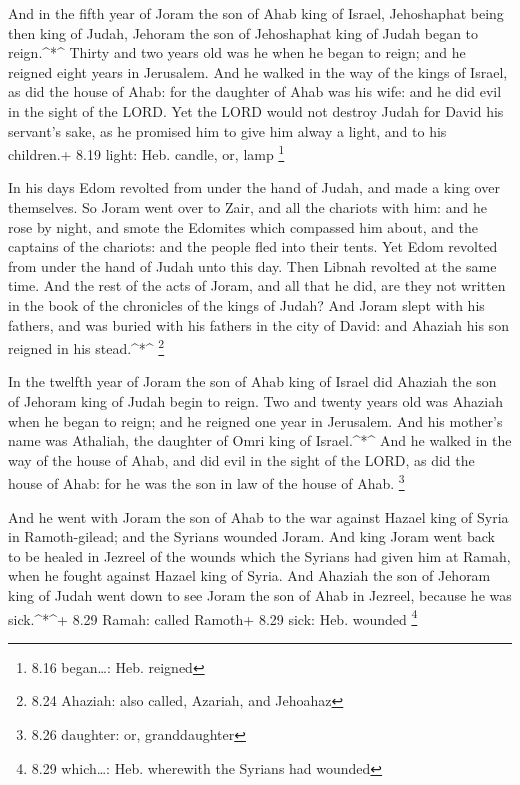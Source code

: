  And in the fifth year of Joram the son of Ahab king of
Israel, Jehoshaphat being then king of Judah, Jehoram the son of
Jehoshaphat king of Judah began to reign.\^{}*\^{}  Thirty
and two years old was he when he began to reign; and he reigned eight
years in Jerusalem.  And he walked in the way of the kings
of Israel, as did the house of Ahab: for the daughter of Ahab was his
wife: and he did evil in the sight of the LORD.  Yet the
LORD would not destroy Judah for David his servant's sake, as he
promised him to give him alway a light, and to his children.+ 8.19
light: Heb. candle, or, lamp \footnote{8.16 began\ldots: Heb. reigned}

 In his days Edom revolted from under the hand of Judah,
and made a king over themselves.  So Joram went over to
Zair, and all the chariots with him: and he rose by night, and smote the
Edomites which compassed him about, and the captains of the chariots:
and the people fled into their tents.  Yet Edom revolted
from under the hand of Judah unto this day. Then Libnah revolted at the
same time.  And the rest of the acts of Joram, and all that
he did, are they not written in the book of the chronicles of the kings
of Judah?  And Joram slept with his fathers, and was buried
with his fathers in the city of David: and Ahaziah his son reigned in
his stead.\^{}*\^{} \footnote{8.24 Ahaziah: also called, Azariah, and
  Jehoahaz}

 In the twelfth year of Joram the son of Ahab king of
Israel did Ahaziah the son of Jehoram king of Judah begin to reign.
 Two and twenty years old was Ahaziah when he began to
reign; and he reigned one year in Jerusalem. And his mother's name was
Athaliah, the daughter of Omri king of Israel.\^{}*\^{} 
And he walked in the way of the house of Ahab, and did evil in the sight
of the LORD, as did the house of Ahab: for he was the son in law of the
house of Ahab. \footnote{8.26 daughter: or, granddaughter}

 And he went with Joram the son of Ahab to the war against
Hazael king of Syria in Ramoth-gilead; and the Syrians wounded Joram.
 And king Joram went back to be healed in Jezreel of the
wounds which the Syrians had given him at Ramah, when he fought against
Hazael king of Syria. And Ahaziah the son of Jehoram king of Judah went
down to see Joram the son of Ahab in Jezreel, because he was
sick.\^{}*\^{}+ 8.29 Ramah: called Ramoth+ 8.29 sick: Heb. wounded
\footnote{8.29 which\ldots: Heb. wherewith the Syrians had wounded}

